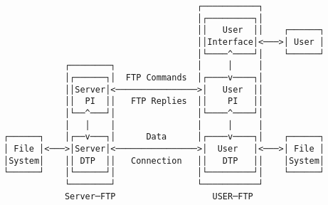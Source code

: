 \documentclass[varwidth=40cm,crop]{standalone}
\begin{document}
\begin{verbatim}
                                      ┌───────────┐
                                      │┌─────────┐│
                                      ││   User  ││    ┌──────┐
                                      ││Interface│<───>│ User │
                                      │└────^────┘│    └──────┘
            ┌────────┐                │     │     │
            │┌──────┐│  FTP Commands  │┌────v────┐│
            ││Server│<────────────────>│   User  ││
            ││  PI  ││   FTP Replies  ││    PI   ││
            │└──^───┘│                │└────^────┘│
            │   │    │                │     │     │
┌──────┐    │┌──v───┐│      Data      │┌────v────┐│    ┌──────┐
│ File │<───>│Server│<────────────────>│  User   │<───>│ File │
│System│    ││ DTP  ││   Connection   ││   DTP   ││    │System│
└──────┘    │└──────┘│                │└─────────┘│    └──────┘
            └────────┘                └───────────┘
            Server─FTP                   USER─FTP
\end{verbatim}
\end{document}
